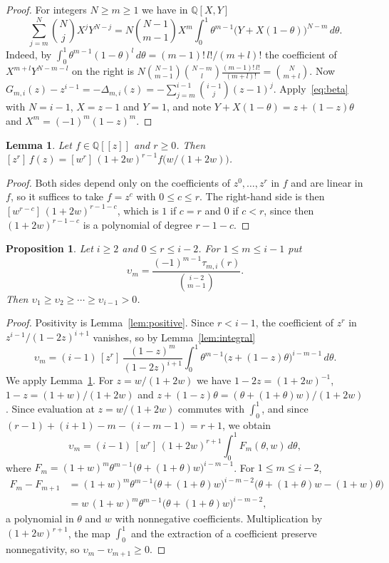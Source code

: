 \documentclass{amsart}
\newtheorem{proposition}[theorem]{Proposition}
\newtheorem{lemma}[theorem]{Lemma}
\theoremstyle{definition}
\theoremstyle{remark}
\numberwithin{equation}{section}
\newcommand{\QQ}{\mathbb{Q}}
\newcommand{\cf}[1]{[#1]\,}
\begin{document}
\begin{proof}
For integers $N\ge m\ge1$ we have in $\QQ[X,Y]$
\begin{equation}\label{eq:beta}
  \sum_{j=m}^{N}\binom{N}{j}X^jY^{N-j}
  =N\binom{N-1}{m-1}X^m\int_0^1 \theta^{m-1}\bigl(Y+X(1-\theta)\bigr)^{N-m}\,d\theta.
\end{equation}
Indeed, by $\int_0^1\theta^{m-1}(1-\theta)^l\,d\theta=(m-1)!\,l!/(m+l)!$ the coefficient of
$X^{m+l}Y^{N-m-l}$ on the right is
$N\binom{N-1}{m-1}\binom{N-m}{l}\frac{(m-1)!\,l!}{(m+l)!}=\binom{N}{m+l}$. Now
$G_{m,i}(z)-z^{i-1}=-\Delta_{m,i}(z)=-\sum_{j=m}^{i-1}\binom{i-1}{j}(z-1)^j$.
Apply~\eqref{eq:beta} with $N=i-1$, $X=z-1$ and $Y=1$, and note
$Y+X(1-\theta)=z+(1-z)\theta$ and $X^m=(-1)^m(1-z)^m$.
\end{proof}

\begin{lemma}\label{lem:substitution}
Let $f\in\QQ[[z]]$ and $r\ge0$. Then
$\cf{z^r}f(z)=\cf{w^r}(1+2w)^{r-1}f\bigl(w/(1+2w)\bigr)$.
\end{lemma}

\begin{proof}
Both sides depend only on the coefficients of $z^0,\dots,z^r$ in $f$ and are
linear in $f$, so it suffices to take $f=z^c$ with $0\le c\le r$. The right-hand
side is then $\cf{w^{r-c}}(1+2w)^{r-1-c}$, which is $1$ if $c=r$ and $0$ if
$c<r$, since then $(1+2w)^{r-1-c}$ is a polynomial of degree $r-1-c$.
\end{proof}

\begin{proposition}\label{prop:monotone}
Let $i\ge2$ and $0\le r\le i-2$. For $1\le m\le i-1$ put
\[
  \upsilon_m=\frac{(-1)^{m-1}\tau_{m,i}(r)}{\binom{i-2}{m-1}}.
\]
Then $\upsilon_1\ge\upsilon_2\ge\cdots\ge\upsilon_{i-1}>0$.
\end{proposition}

\begin{proof}
Positivity is Lemma~\ref{lem:positive}. Since $r<i-1$, the coefficient of $z^r$
in $z^{i-1}/(1-2z)^{i+1}$ vanishes, so by Lemma~\ref{lem:integral}
\[
  \upsilon_m=(i-1)\,\cf{z^r}\frac{(1-z)^m}{(1-2z)^{i+1}}
  \int_0^1 \theta^{m-1}\bigl(z+(1-z)\theta\bigr)^{i-m-1}\,d\theta.
\]
We apply Lemma~\ref{lem:substitution}. For $z=w/(1+2w)$ we have
$1-2z=(1+2w)^{-1}$, $1-z=(1+w)/(1+2w)$ and $z+(1-z)\theta=(\theta+(1+\theta)w)/(1+2w)$. Since
evaluation at $z=w/(1+2w)$ commutes with $\int_0^1$, and since
$(r-1)+(i+1)-m-(i-m-1)=r+1$, we obtain
\[
  \upsilon_m=(i-1)\,\cf{w^r}(1+2w)^{r+1}\int_0^1F_m(\theta,w)\,d\theta,
\]
where $F_m=(1+w)^m\theta^{m-1}\bigl(\theta+(1+\theta)w\bigr)^{i-m-1}$.
For $1\le m\le i-2$,
\begin{align*}
  F_m-F_{m+1}&=(1+w)^m\theta^{m-1}\bigl(\theta+(1+\theta)w\bigr)^{i-m-2}
  \bigl(\theta+(1+\theta)w-(1+w)\theta\bigr)\\
  &=w\,(1+w)^m\theta^{m-1}\bigl(\theta+(1+\theta)w\bigr)^{i-m-2},
\end{align*}
a polynomial in $\theta$ and $w$ with nonnegative coefficients. Multiplication by
$(1+2w)^{r+1}$, the map $\int_0^1$ and the extraction of a coefficient preserve
nonnegativity, so $\upsilon_m-\upsilon_{m+1}\ge0$.
\end{proof}
\end{document}
